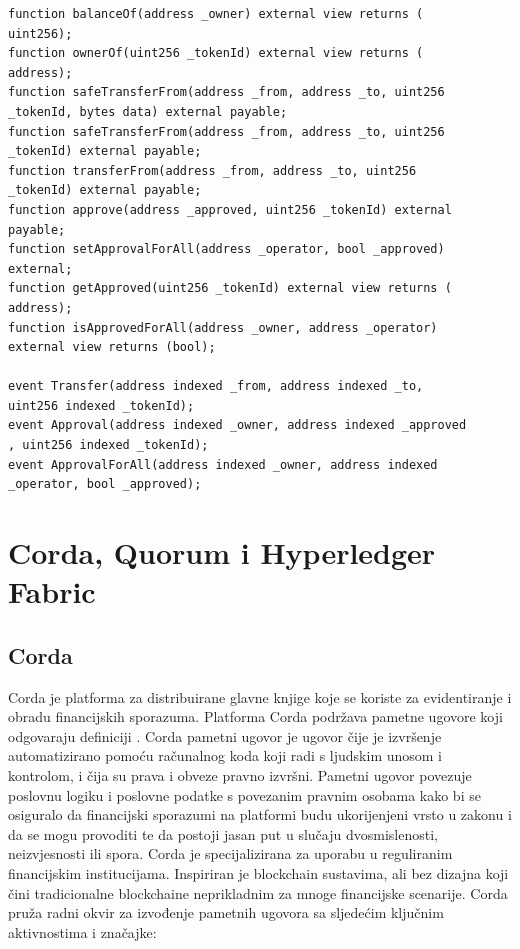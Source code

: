 \documentclass[times, utf8, diplomski]{fer}
\begin{document}
\begin{lstlisting}
function balanceOf(address _owner) external view returns (
uint256);
function ownerOf(uint256 _tokenId) external view returns (
address);
function safeTransferFrom(address _from, address _to, uint256
_tokenId, bytes data) external payable;
function safeTransferFrom(address _from, address _to, uint256
_tokenId) external payable;
function transferFrom(address _from, address _to, uint256
_tokenId) external payable;
function approve(address _approved, uint256 _tokenId) external
payable;
function setApprovalForAll(address _operator, bool _approved)
external;
function getApproved(uint256 _tokenId) external view returns (
address);
function isApprovedForAll(address _owner, address _operator)
external view returns (bool);

event Transfer(address indexed _from, address indexed _to,
uint256 indexed _tokenId);
event Approval(address indexed _owner, address indexed _approved
, uint256 indexed _tokenId);
event ApprovalForAll(address indexed _owner, address indexed
_operator, bool _approved);
\end{lstlisting}

\section{Corda, Quorum i Hyperledger Fabric}

\subsection{Corda}

Corda je platforma za distribuirane glavne knjige koje se koriste za evidentiranje i obradu financijskih sporazuma. Platforma Corda podržava pametne ugovore koji odgovaraju definiciji \cite{Corda}. Corda pametni ugovor je ugovor čije je izvršenje automatizirano pomoću računalnog koda koji radi s ljudskim unosom i kontrolom, i čija su prava i obveze pravno izvršni. Pametni ugovor povezuje poslovnu logiku i poslovne podatke s povezanim pravnim osobama kako bi se osiguralo da financijski sporazumi na platformi budu ukorijenjeni vrsto u zakonu i da se mogu provoditi te da postoji jasan put u slučaju dvosmislenosti, neizvjesnosti ili spora.
Corda je specijalizirana za uporabu u reguliranim financijskim institucijama. Inspiriran je blockchain sustavima, ali bez dizajna koji čini tradicionalne blockchaine neprikladnim za mnoge financijske scenarije. Corda pruža radni okvir za izvođenje pametnih ugovora sa sljedećim ključnim aktivnostima i značajke:
\end{document}
